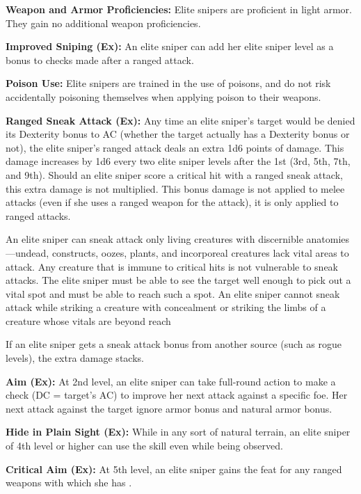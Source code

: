 {
\textbf{Weapon and Armor Proficiencies:} Elite snipers are proficient in light armor. They gain no additional weapon proficiencies.

\textbf{Improved Sniping (Ex):} An elite sniper can add her elite sniper level as a bonus to  checks made after a ranged attack.

\textbf{Poison Use:} Elite snipers are trained in the use of poisons, and do not risk accidentally poisoning themselves when applying poison to their weapons.

\textbf{Ranged Sneak Attack (Ex):} Any time an elite sniper's target would be denied its Dexterity bonus to AC (whether the target actually has a Dexterity bonus or not), the elite sniper's ranged attack deals an extra 1d6 points of damage. This damage increases by 1d6 every two elite sniper levels after the 1st (3rd, 5th, 7th, and 9th). Should an elite sniper score a critical hit with a ranged sneak attack, this extra damage is not multiplied. This bonus damage is not applied to melee attacks (even if she uses a ranged weapon for the attack), it is only applied to ranged attacks.

An elite sniper can sneak attack only living creatures with discernible anatomies---undead, constructs, oozes, plants, and incorporeal creatures lack vital areas to attack. Any creature that is immune to critical hits is not vulnerable to sneak attacks. The elite sniper must be able to see the target well enough to pick out a vital spot and must be able to reach such a spot. An elite sniper cannot sneak attack while striking a creature with concealment or striking the limbs of a creature whose vitals are beyond reach\

If an elite sniper gets a sneak attack bonus from another source (such as rogue levels), the extra damage stacks.

\textbf{Aim (Ex):} At 2nd level, an elite sniper can take full-round action to make a  check (DC = target's AC) to improve her next attack against a specific foe. Her next attack against the target ignore armor bonus and natural armor bonus.

\textbf{Hide in Plain Sight (Ex):} While in any sort of natural terrain, an elite sniper of 4th level or higher can use the  skill even while being observed.

\textbf{Critical Aim (Ex):} At 5th level, an elite sniper gains the  feat for any ranged weapons with which she has .

}
